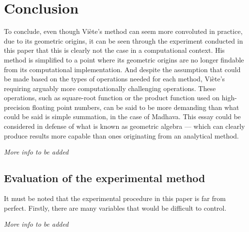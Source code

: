 \section{Conclusion}

To conclude, even though Viète's method can seem more convoluted in practice, due to its geometric origins,
it can be seen through the experiment conducted in this paper that this is clearly not the case
in a computational context. His method is simplified to a point where its geometric origins are no
longer findable from its computational implementation. And despite the assumption that could be
made based on the types of operations needed for each method, Viète's requiring arguably more
computationally challenging operations. These operations, such as square-root function or the product function
used on high-precision floating point numbers, can be said to be more demanding than what could be said
is simple summation, in the case of Madhava. This essay could be considered in defense of
what is known as geometric algebra --- which can clearly produce results more capable than ones
originating from an analytical method.

\textit{More info to be added}

\subsection{Evaluation of the experimental method}

It must be noted that the experimental procedure in this paper is far from perfect. Firstly,
there are many variables that would be difficult to control.


\textit{More info to be added}